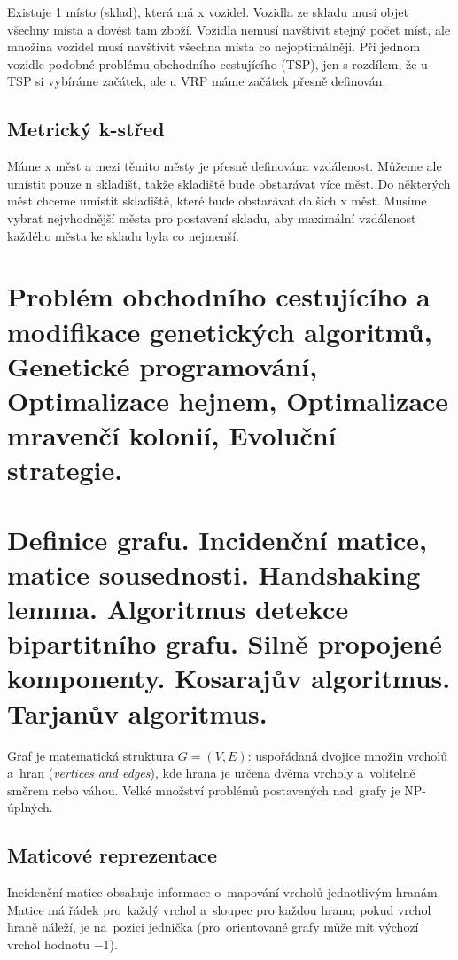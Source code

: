 Existuje 1 místo (sklad), která má x vozidel.
Vozidla ze skladu musí objet všechny místa a dovést tam zboží. 
Vozidla nemusí navštívit stejný počet míst, ale množina vozidel musí navštívit všechna místa co nejoptimálněji. 
Při jednom vozidle podobné problému obchodního cestujícího (TSP), jen s rozdílem, že u TSP si vybíráme začátek, ale u VRP máme začátek přesně definován.

\subsection{Metrický k-střed}

Máme x měst a mezi těmito městy je přesně definována vzdálenost.
Můžeme ale umístit pouze n skladišť, takže skladiště bude obstarávat více měst. 
Do některých měst chceme umístit skladiště, které bude obstarávat dalších x měst.
Musíme vybrat nejvhodnější města pro postavení skladu, aby maximální vzdálenost každého města ke skladu byla co nejmenší.


\clearpage
\section{Problém obchodního cestujícího a modifikace genetických algoritmů, Genetické programování, Optimalizace hejnem, Optimalizace mravenčí kolonií, Evoluční strategie.}


\clearpage
\section{Definice grafu. Incidenční matice, matice sousednosti. Handshaking lemma. Algoritmus detekce bipartitního grafu. Silně propojené komponenty. Kosarajův algoritmus. Tarjanův algoritmus.}

Graf je matematická struktura $G = (V, E)$: uspořádaná dvojice množin vrcholů a~hran (\emph{vertices and edges}), kde hrana je určena dvěma vrcholy a~volitelně směrem nebo váhou.
Velké množství problémů postavených nad~grafy je NP-úplných.

\subsection{Maticové reprezentace}

Incidenční matice obsahuje informace o~mapování vrcholů jednotlivým hranám.
Matice má řádek pro~každý vrchol a~sloupec pro každou hranu; pokud vrchol hraně náleží, je na~pozici jednička (pro~orientované grafy může mít výchozí vrchol hodnotu $-1$).

